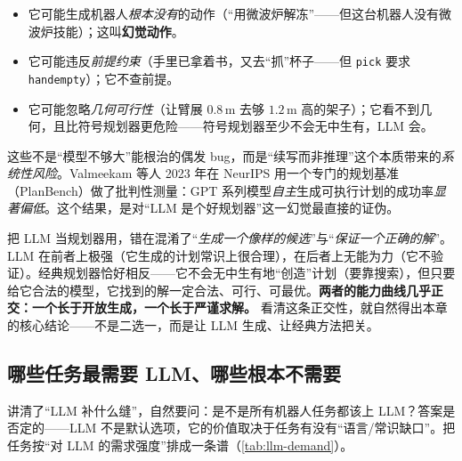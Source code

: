 \begin{itemize}
  \item 它可能生成机器人\emph{根本没有}的动作（“用微波炉解冻”——但这台机器人没有微波炉技能）；这叫\textbf{幻觉动作}。
  \item 它可能违反\emph{前提约束}（手里已拿着书，又去“抓”杯子——但 \texttt{pick} 要求 \texttt{handempty}）；它不查前提。
  \item 它可能忽略\emph{几何可行性}（让臂展 $0.8\,$m 去够 $1.2\,$m 高的架子）；它看不到几何，且比符号规划器更危险——符号规划器至少不会无中生有，LLM 会。
\end{itemize}

\noindent 这些不是“模型不够大”能根治的偶发 bug，而是“续写而非推理”这个本质带来的\emph{系统性风险}。Valmeekam 等人 2023 年在 NeurIPS 用一个专门的规划基准（PlanBench）做了批判性测量：GPT 系列模型\emph{自主}生成可执行计划的成功率\emph{显著偏低}\cite{valmeekam2023planbench}。这个结果，是对“LLM 是个好规划器”这一幻觉最直接的证伪。%

\begin{insight}
把 LLM 当规划器用，错在混淆了“\emph{生成一个像样的候选}”与“\emph{保证一个正确的解}”。LLM 在前者上极强（它生成的计划常识上很合理），在后者上无能为力（它不验证）。经典规划器恰好相反——它不会无中生有地“创造”计划（要靠搜索），但只要给它合法的模型，它找到的解一定合法、可行、可最优。\textbf{两者的能力曲线几乎正交：一个长于开放生成，一个长于严谨求解。} 看清这条正交性，就自然得出本章的核心结论——不是二选一，而是让 LLM 生成、让经典方法把关。
\end{insight}

\subsection{哪些任务最需要 LLM、哪些根本不需要}
\label{sec:llm-when}

讲清了“LLM 补什么缝”，自然要问：是不是所有机器人任务都该上 LLM？答案是否定的——LLM 不是默认选项，它的价值取决于任务有没有“语言/常识缺口”。把任务按“对 LLM 的需求强度”排成一条谱（\cref{tab:llm-demand}）。

